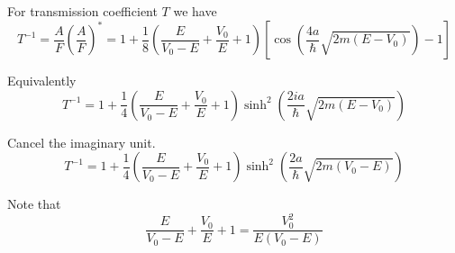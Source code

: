 For transmission coefficient $T$ we have
\begin{equation*}
T^{-1}=\frac{A}{F}\left(\frac{A}{F}\right)^*
=1+\frac{1}{8}\left(\frac{E}{V_0-E}+\frac{V_0}{E}+1\right)
\left[\cos\left(\frac{4a}{\hbar}\sqrt{2m(E-V_0)}\right)-1\right]
\tag{5}
\end{equation*}

Equivalently
\begin{equation*}
T^{-1}=1+\frac{1}{4}\left(\frac{E}{V_0-E}+\frac{V_0}{E}+1\right)
\sinh^2\left(\frac{2ia}{\hbar}\sqrt{2m(E-V_0)}\right)
\tag{6}
\end{equation*}

Cancel the imaginary unit.
\begin{equation*}
T^{-1}=1+\frac{1}{4}\left(\frac{E}{V_0-E}+\frac{V_0}{E}+1\right)
\sinh^2\left(\frac{2a}{\hbar}\sqrt{2m(V_0-E)}\right)
\end{equation*}

Note that
\begin{equation*}
\frac{E}{V_0-E}+\frac{V_0}{E}+1=\frac{V_0^2}{E(V_0-E)}
\tag{7}
\end{equation*}



